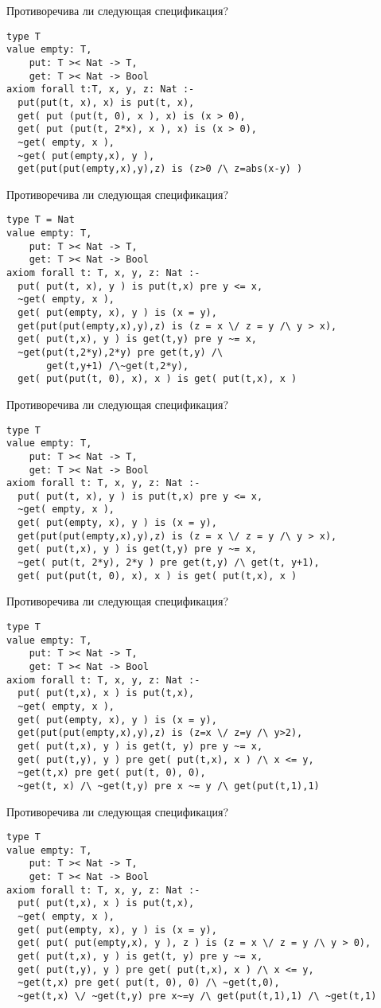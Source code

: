 \z Противоречива ли следующая спецификация?
\begin{lstlisting}
type T
value empty: T,
    put: T >< Nat -> T,
    get: T >< Nat -> Bool
axiom forall t:T, x, y, z: Nat :-
  put(put(t, x), x) is put(t, x),
  get( put (put(t, 0), x ), x) is (x > 0),
  get( put (put(t, 2*x), x ), x) is (x > 0),
  ~get( empty, x ),
  ~get( put(empty,x), y ),
  get(put(put(empty,x),y),z) is (z>0 /\ z=abs(x-y) )
\end{lstlisting}

\z Противоречива ли следующая спецификация?
\begin{lstlisting}
type T = Nat
value empty: T,
    put: T >< Nat -> T,
    get: T >< Nat -> Bool
axiom forall t: T, x, y, z: Nat :-
  put( put(t, x), y ) is put(t,x) pre y <= x,
  ~get( empty, x ),
  get( put(empty, x), y ) is (x = y),
  get(put(put(empty,x),y),z) is (z = x \/ z = y /\ y > x),
  get( put(t,x), y ) is get(t,y) pre y ~= x,
  ~get(put(t,2*y),2*y) pre get(t,y) /\
       get(t,y+1) /\~get(t,2*y),
  get( put(put(t, 0), x), x ) is get( put(t,x), x )
\end{lstlisting}

\z Противоречива ли следующая спецификация?
\begin{lstlisting}
type T
value empty: T,
    put: T >< Nat -> T,
    get: T >< Nat -> Bool
axiom forall t: T, x, y, z: Nat :-
  put( put(t, x), y ) is put(t,x) pre y <= x,
  ~get( empty, x ),
  get( put(empty, x), y ) is (x = y),
  get(put(put(empty,x),y),z) is (z = x \/ z = y /\ y > x),
  get( put(t,x), y ) is get(t,y) pre y ~= x,
  ~get( put(t, 2*y), 2*y ) pre get(t,y) /\ get(t, y+1),
  get( put(put(t, 0), x), x ) is get( put(t,x), x )
\end{lstlisting}

\z Противоречива ли следующая спецификация?
\begin{lstlisting}
type T
value empty: T,
    put: T >< Nat -> T,
    get: T >< Nat -> Bool
axiom forall t: T, x, y, z: Nat :-
  put( put(t,x), x ) is put(t,x),
  ~get( empty, x ),
  get( put(empty, x), y ) is (x = y),
  get(put(put(empty,x),y),z) is (z=x \/ z=y /\ y>2),
  get( put(t,x), y ) is get(t, y) pre y ~= x,
  get( put(t,y), y ) pre get( put(t,x), x ) /\ x <= y,
  ~get(t,x) pre get( put(t, 0), 0),
  ~get(t, x) /\ ~get(t,y) pre x ~= y /\ get(put(t,1),1)
\end{lstlisting}

\z Противоречива ли следующая спецификация?
\begin{lstlisting}
type T
value empty: T,
    put: T >< Nat -> T,
    get: T >< Nat -> Bool
axiom forall t: T, x, y, z: Nat :-
  put( put(t,x), x ) is put(t,x),
  ~get( empty, x ),
  get( put(empty, x), y ) is (x = y),
  get( put( put(empty,x), y ), z ) is (z = x \/ z = y /\ y > 0),
  get( put(t,x), y ) is get(t, y) pre y ~= x,
  get( put(t,y), y ) pre get( put(t,x), x ) /\ x <= y,
  ~get(t,x) pre get( put(t, 0), 0) /\ ~get(t,0),
  ~get(t,x) \/ ~get(t,y) pre x~=y /\ get(put(t,1),1) /\ ~get(t,1)
\end{lstlisting}

